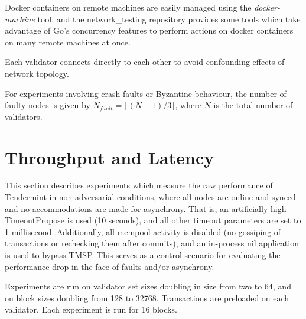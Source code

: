 Docker containers on remote machines are easily managed using the \emph{docker-machine} tool, 
and the network\_testing repository provides some tools which take advantage of Go's concurrency features
to perform actions on docker containers on many remote machines at once.

Each validator connects directly to each other to avoid confounding effects of network topology.

For experiments involving crash faults or Byzantine behaviour, the number of faulty nodes is given by $N_{fault} = \lfloor(N-1)/3\rfloor$,
where $N$ is the total number of validators.

\section{Throughput and Latency}

This section describes experiments which measure the raw performance of Tendermint in non-adversarial conditions,
where all nodes are online and synced and no accommodations are made for asynchrony.
That is, an artificially high TimeoutPropose is used (10 seconds), and all other timeout parameters are set to 1 millisecond.
Additionally, all mempool activity is disabled (no gossiping of transactions or rechecking them after commits),
and an in-process nil application is used to bypass TMSP.
This serves as a control scenario for evaluating the performance drop in the face of faults and/or asynchrony.

Experiments are run on validator set sizes doubling in size from two to 64, and on block sizes doubling from 128 to 32768.
Transactions are preloaded on each validator. Each experiment is run for 16 blocks. 

